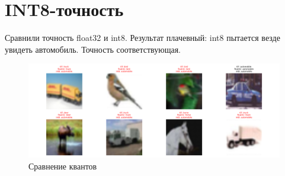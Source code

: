 \documentclass[12pt,a4paper]{article}
\begin{document}
\section {INT8-точность}

Сравнили точность float32 и int8. Результат плачевный: int8 пытается везде увидеть автомобиль. Точность соответствующая.

\begin{figure}[ht]
    \centering
    \includegraphics[width=1.2\textwidth]{docs/visualization.png}
    \caption{Сравнение квантов}
    \label{fig:accuracy_plot}
\end{figure}
\end{document}
